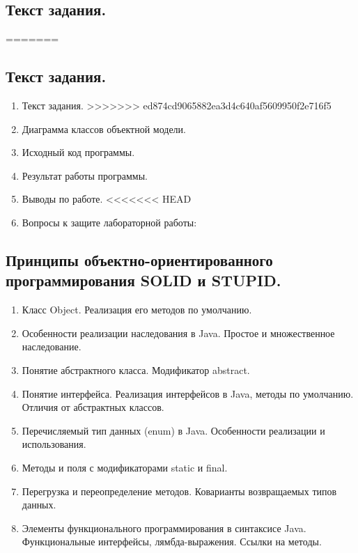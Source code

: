 \documentclass[11pt]{article}
\begin{document}
\subsection{Текст задания.}
\label{sec:org1746bbe}
\begin{enumerate}
=======
\end{enumerate}

\subsection{Текст задания.}
\label{sec:org14ec5ef}

\begin{enumerate}
\item Текст задания.
>>>>>>> ed874cd9065882ea3d4c640af5609950f2e716f5
\item Диаграмма классов объектной модели.
\item Исходный код программы.
\item Результат работы программы.
\item Выводы по работе.
<<<<<<< HEAD
\item Вопросы к защите лабораторной работы:
\end{enumerate}

\subsection{Принципы объектно-ориентированного программирования SOLID и STUPID.}
\label{sec:orgf6bb626}
\begin{enumerate}
\item Класс Object. Реализация его методов по умолчанию.
\item Особенности реализации наследования в Java. Простое и множественное наследование.
\item Понятие абстрактного класса. Модификатор abstract.
\item Понятие интерфейса. Реализация интерфейсов в Java, методы по умолчанию. Отличия от абстрактных классов.
\item Перечисляемый тип данных (enum) в Java. Особенности реализации и использования.
\item Методы и поля с модификаторами static и final.
\item Перегрузка и переопределение методов. Коварианты возвращаемых типов данных.
\item Элементы функционального программирования в синтаксисе Java. Функциональные интерфейсы, лямбда-выражения. Ссылки на методы.
\end{enumerate}
\end{document}
